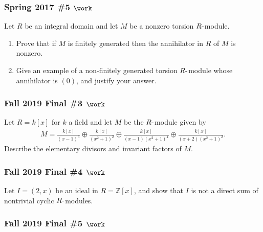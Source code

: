 \hypertarget{spring-2017-5-work}{%
\subsubsection{\texorpdfstring{Spring 2017 \#5
\(\work\)}{Spring 2017 \#5 \textbackslash work}}\label{spring-2017-5-work}}

Let \(R\) be an integral domain and let \(M\) be a nonzero torsion
\(R{\hbox{-}}\)module.

\begin{enumerate}
\def\labelenumi{\alph{enumi}.}
\item
  Prove that if \(M\) is finitely generated then the annihilator in
  \(R\) of \(M\) is nonzero.
\item
  Give an example of a non-finitely generated torsion
  \(R{\hbox{-}}\)module whose annihilator is \((0)\), and justify your
  answer.
\end{enumerate}

\hypertarget{fall-2019-final-3-work}{%
\subsubsection{\texorpdfstring{Fall 2019 Final \#3
\(\work\)}{Fall 2019 Final \#3 \textbackslash work}}\label{fall-2019-final-3-work}}

Let \(R = k[x]\) for \(k\) a field and let \(M\) be the
\(R{\hbox{-}}\)module given by
\begin{align*}
M=\frac{k[x]}{(x-1)^{3}} \oplus \frac{k[x]}{\left(x^{2}+1\right)^{2}} \oplus \frac{k[x]}{(x-1)\left(x^{2}+1\right)^{4}} \oplus \frac{k[x]}{(x+2)\left(x^{2}+1\right)^{2}}
.\end{align*}
Describe the elementary divisors and invariant factors of \(M\).

\hypertarget{fall-2019-final-4-work}{%
\subsubsection{\texorpdfstring{Fall 2019 Final \#4
\(\work\)}{Fall 2019 Final \#4 \textbackslash work}}\label{fall-2019-final-4-work}}

Let \(I = (2, x)\) be an ideal in \(R = {\mathbb{Z}}[x]\), and show that
\(I\) is not a direct sum of nontrivial cyclic \(R{\hbox{-}}\)modules.

\hypertarget{fall-2019-final-5-work}{%
\subsubsection{\texorpdfstring{Fall 2019 Final \#5
\(\work\)}{Fall 2019 Final \#5 \textbackslash work}}\label{fall-2019-final-5-work}}

